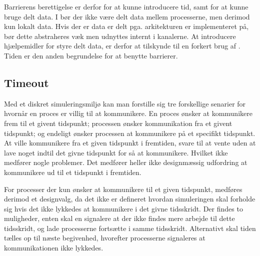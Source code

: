
Barrierens berettigelse er derfor for at kunne introducere tid, samt for at kunne bruge delt data. I \csp bør der ikke være delt data mellem processerne, men derimod kun  lokalt data. Hvis der er data er delt pga. arkitekturen \csp er implementeret på, bør dette abstraheres væk men udnyttes internt i kanalerne. At introducere hjælpemidler for styre delt data, er derfor at tilskynde til en forkert brug af \csp. Tiden er den anden begrundelse for at benytte barrierer.


\subsection{Timeout} 

Med et diskret simuleringsmiljø kan man forstille sig tre forskellige senarier for  hvornår  en proces er villig
til at kommunikere. En proces ønsker at kommunikere  frem til et givent tidspunkt; processen ønsker kommunikation fra et givent tidspunkt; og endeligt ønsker processen at kommunikere på et specifikt tidspunkt.
At ville kommunikere fra et given tidspunkt i fremtiden, svare til at   
vente uden at lave noget indtil det givne tidspunkt for så at kommunikere. Hvilket ikke medfører nogle problemer. Det medfører heller ikke  designmæssig udfordring at kommunikere ud til et tidspunkt i fremtiden.

For processer der kun ønsker at kommunikere til et given tidspunkt,
medføres derimod et designvalg, da det ikke er defineret hvordan simuleringen skal forholde sig hvis det ikke lykkedes at kommunikere   
i det givne tidsskridt. Der findes to muligheder, enten skal \sched     
en signalere at der ikke findes mere arbejde til dette tidsskridt, og   
lade processerne fortsætte i samme tidsskridt. Alternativt skal tiden   
tælles op til næste begivenhed, hvorefter processerne signaleres at    
kommunikationen ikke lykkedes. 


